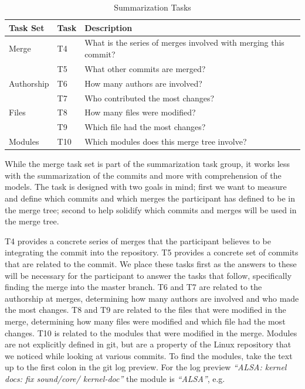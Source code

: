 
\begin{table}[htpb]
  \centering
  \caption{Summarization Tasks}
  \label{tab:summarization_tasks}
  \begin{tabulary}{\linewidth}{LLL}
    \toprule
    Task Set   & Task & Description\\\midrule
    Merge      & T4   & What is the series of merges involved with merging this
    commit?\\
    & T5   & What other commits are merged?\\
    Authorship & T6   & How many authors are involved?\\
    & T7   & Who contributed the most changes?\\
    Files      & T8   & How many files were modified?\\
    & T9   & Which file had the most changes?\\
    Modules    & T10  & Which modules does this merge tree involve?\\
    \bottomrule
  \end{tabulary}
\end{table}


While the merge task set is part of the summarization task group, it
works less with the summarization of the commits and more with
comprehension of the models. The task is designed with two goals in
mind; first we want to measure and define which commits and which merges
the participant has defined to be in the merge tree; second to help
solidify which commits and merges will be used in the merge tree.

T4 provides a concrete series of merges that the participant believes to
be integrating the commit into the repository. T5 provides a concrete
set of commits that are related to the commit. We place these tasks
first as the answers to these will be necessary for the participant to
answer the tasks that follow, specifically finding the merge into the
master branch. T6 and T7 are related to the authorship at merges,
determining how many authors are involved and who made the most changes.
T8 and T9 are related to the files that were modified in the merge,
determining how many files were modified and which file had the most
changes. T10 is related to the modules that were modified in the merge.
Modules are not explicitly defined in git, but are a property of the
Linux repository that we noticed while looking at various commits. To
find the modules, take the text up to the first colon in the git log
preview. For the log preview \textit{``ALSA: kernel docs: fix
  sound/core/ kernel-doc''} the module is \textit{``ALSA''}, e.g.

